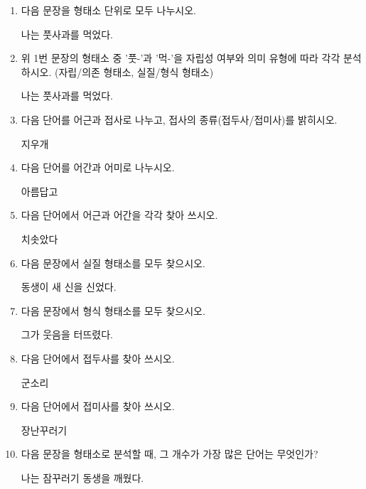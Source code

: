 \documentclass[fs9,seriesRus]{korfarm-base}
\begin{document}
\kfActivityBg \par{}\par\nopagebreak[4]\smallskip\nopagebreak[4]

\kfActivityBg {}
\par{}\par\nopagebreak[4]\smallskip\nopagebreak[4]
\begin{enumerate}[leftmargin=22pt, itemsep=6pt, topsep=4pt, label=\textbf{\arabic*.}]
\item 다음 문장을 형태소 단위로 모두 나누시오.
\begin{kfEvidence}나는 풋사과를 먹었다.\end{kfEvidence}
\item 위 1번 문장의 형태소 중 '풋-'과 '먹-'을 자립성 여부와 의미 유형에 따라 각각 분석하시오.  (자립/의존 형태소, 실질/형식 형태소)
\begin{kfEvidence}나는 풋사과를 먹었다.\end{kfEvidence}
\item 다음 단어를 어근과 접사로 나누고, 접사의 종류(접두사/접미사)를 밝히시오.
\begin{kfEvidence}지우개\end{kfEvidence}
\item 다음 단어를 어간과 어미로 나누시오.
\begin{kfEvidence}아름답고\end{kfEvidence}
\item 다음 단어에서 어근과 어간을 각각 찾아 쓰시오.
\begin{kfEvidence}치솟았다\end{kfEvidence}
\item 다음 문장에서 실질 형태소를 모두 찾으시오.
\begin{kfEvidence}동생이 새 신을 신었다.\end{kfEvidence}
\item 다음 문장에서 형식 형태소를 모두 찾으시오.
\begin{kfEvidence}그가 웃음을 터뜨렸다.\end{kfEvidence}
\item 다음 단어에서 접두사를 찾아 쓰시오.
\begin{kfEvidence}군소리\end{kfEvidence}
\item 다음 단어에서 접미사를 찾아 쓰시오.
\begin{kfEvidence}장난꾸러기\end{kfEvidence}
\item 다음 문장을 형태소로 분석할 때, 그 개수가 가장 많은 단어는 무엇인가?
\begin{kfEvidence}나는 잠꾸러기 동생을 깨웠다.\end{kfEvidence}
\end{enumerate}
\end{document}
